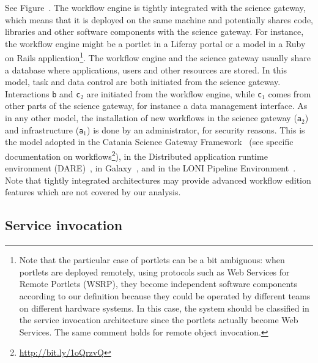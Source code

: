 \documentclass[preprint,3p,twocolumn]{elsarticle}
\newcommand{\correction}[1]{\color{blue}#1\color{black}\xspace}
\begin{document}
See Figure~. The workflow engine is tightly
integrated with the science gateway, which means that it is deployed
on the same machine and potentially shares code, libraries and other
software components with the science gateway. For instance, the
workflow engine might be a portlet in a Liferay portal or a model in a
Ruby on Rails application\footnote{\correction{Note that the
    particular case of portlets can be a bit ambiguous: when portlets
    are deployed remotely, using protocols such as Web Services for
    Remote Portlets (WSRP), they become independent software
    components according to our definition because they could be
    operated by different teams on different hardware systems. In this
    case, the system should be classified in the service invocation
    architecture since the portlets actually become Web Services. The
    same comment holds for remote object invocation.}}. The workflow
engine and the science gateway usually share a database where
applications, users and other resources are stored.  In this model,
task and data control are both initiated from the science
gateway. Interactions \texttt{b} and \texttt{c$_2$} are initiated from
the workflow engine, while \texttt{c$_1$} comes from other parts of
the science gateway, for instance a data management interface. As in
any other model, the installation of new workflows in the science
gateway (\texttt{a$_2$}) and infrastructure (\texttt{a$_1$}) is done
by an administrator, for security reasons. This is the model adopted
in the Catania Science Gateway Framework~\cite{ardizzone2012decide}
(see specific documentation on
workflows\footnote{\url{http://bit.ly/1oQrzvQ}}), in the Distributed
application runtime environment
(DARE)~\cite{maddineni2012distributed}, in
Galaxy~\cite{goecks2010galaxy}, and in the LONI Pipeline
Environment~\cite{dinov2009efficient}. Note that tightly integrated
architectures may provide advanced workflow edition features which are
not covered by our analysis.

\subsection{Service invocation}
\end{document}
